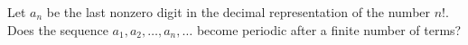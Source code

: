 Let $a_n$ be the last nonzero digit in the decimal representation of the number $n!$. Does the sequence $a_1, a_2, \ldots, a_n, \ldots$ become periodic after a finite number of terms?
